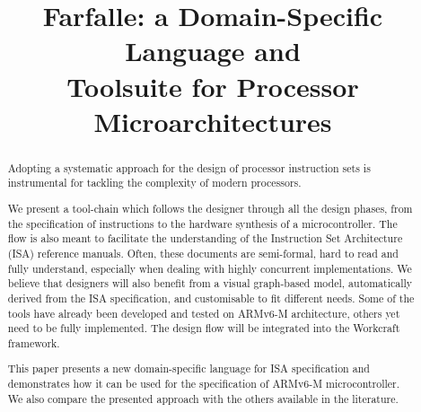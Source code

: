 \documentclass[conference]{IEEEtran}
\begin{document}


\title{Farfalle: a Domain-Specific Language and\\Toolsuite for Processor Microarchitectures}

\author{
\and
{}
\and
{}
}

\maketitle

\begin{abstract}
Adopting a systematic approach for the design of processor instruction sets is
instrumental for tackling the complexity of modern processors.

We present a tool-chain which follows the designer through all the design phases,
from the specification of instructions to the hardware synthesis of a
microcontroller. The flow is also meant to facilitate the understanding of the
Instruction Set Architecture (ISA) reference manuals. Often, these documents are
semi-formal, hard to read and fully understand, especially when dealing with
highly concurrent implementations. We believe that designers will also
benefit from a visual graph-based model, automatically derived from the ISA
specification, and customisable to fit different needs. Some of the tools have
already been developed and tested on ARMv6-M architecture, others yet need to be
fully implemented. The design flow will be integrated into the Workcraft framework.

This paper presents a new domain-specific language for ISA specification and demonstrates
how it can be used for the specification of ARMv6-M microcontroller. We also compare
the presented approach with the others available in the literature.
\end{abstract}
\end{document}
